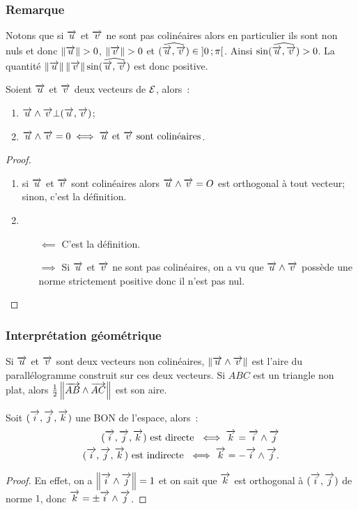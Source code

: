 \subsubsection{Remarque}
Notons que si \(\vu\) et \(\vv\) ne sont pas colinéaires alors en particulier ils sont non nuls et donc \(\norme{\vu}>0\), \(\norme{\vv}>0\) et \((\widehat{\vu,\vv})\in \intervalleoo{0}{\pi}\). Ainsi \(\sin(\widehat{\vu,\vv})>0\). La quantité \(\norme{\vu}\norme{\vv}\sin(\widehat{\vu,\vv})\) est donc positive.
\begin{prop}
  \label{prop:1}
  Soient \(\vu\) et \(\vv\) deux vecteurs de \(\E\), alors~:
  \begin{enumerate}
  \item \(\vu \wedge \vv \bot (\vu,\vv)\);
  \item \(\vu \wedge \vv = 0 \iff \vu \textrm{ et } \vv \text{ sont colinéaires}\).
  \end{enumerate}
\end{prop}
\begin{proof}
  \begin{enumerate}
  \item si \(\vu\) et \(\vv\) sont colinéaires alors \(\vu \wedge \vv = O\) est orthogonal à tout vecteur; sinon, c'est la définition.
  \item
    \begin{itemize}
    \item[\(\impliedby\)] C'est la définition.
    \item[\(\implies\)] Si \(\vu\) et \(\vv\) ne sont pas colinéaires, on a vu que \(\vu \wedge \vv\) possède une norme strictement positive donc il n'est pas nul.\qedhere
    \end{itemize}
  \end{enumerate}
\end{proof}

\subsubsection{Interprétation géométrique}
Si \(\vu\) et \(\vv\) sont deux vecteurs non colinéaires, \(\norme{\vu\wedge\vv}\) est l'aire du parallélogramme construit sur ces deux vecteurs. Si \(ABC\) est un triangle non plat, alors \(\frac{1}{2}\norme{\vect{AB}\wedge\vect{AC}}\) est son aire.
\begin{prop}
  Soit \(\bondtrois\) une BON de l'espace, alors~:
  \begin{align}
    \bondtrois\text{~est directe~}\iff \vk=\vi\wedge\vj\\
    \bondtrois\text{~est indirecte~}\iff \vk=-\vi\wedge\vj.
  \end{align}
\end{prop}
\begin{proof}
  En effet, on a \(\norme{\vi\wedge\vj}=1\) et on sait que \(\vk\) est orthogonal à \((\vi,\vj)\) de norme \(1\), donc \(\vk=\pm\vi\wedge\vj\).  
\end{proof}

